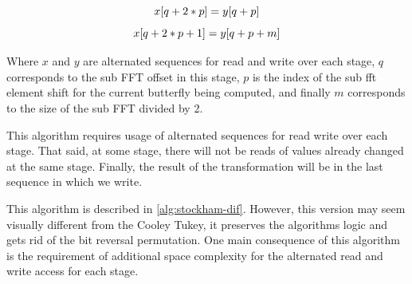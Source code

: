 \documentclass[
  oneside,
  11pt, a4paper,
  footinclude=true,
  headinclude=true,
  cleardoublepage=empty
]{scrbook}
\begin{document}
\begin{equation} \label{eq:nat_order_even_indexing}
    x[q + 2*p] = y[q + p] \\
\end{equation}
\begin{equation} \label{eq:nat_order_odd_indexing}
    x[q + 2*p + 1] = y[q + p + m] \\
\end{equation}

Where $x$ and $y$ are alternated sequences for read and write over each stage, $q$ corresponds to the sub FFT offset in this stage, $p$ is the index of the sub \acrshort{fft} element shift for the current butterfly being computed, and finally $m$ corresponds to the size of the sub FFT divided by 2.

This algorithm requires usage of alternated sequences for read write over each stage. That said, at some stage, there will not be reads of values already changed at the same stage. Finally, the result of the transformation will be in the last sequence in which we write.
\newline



This algorithm is described in \autoref{alg:stockham-dif}. However, this version may seem visually different from the Cooley Tukey, it preserves the algorithms logic and gets rid of the bit reversal permutation. One main consequence of this algorithm is the requirement of additional space complexity for the alternated read and write access  for each stage. %



\end{document}

